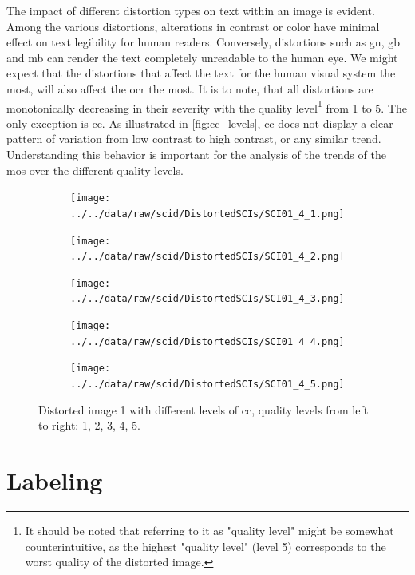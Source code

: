 The impact of different distortion types on text within an image is evident.
Among the various distortions, alterations in contrast or color have minimal effect on text legibility for human readers.
Conversely, distortions such as \gls{gn}, \gls{gb} and \gls{mb} can render the text completely unreadable to the human eye.
We might expect that the distortions that affect the text for the human visual system the most, will also affect the \gls{ocr} the most.
It is to note, that all distortions are monotonically decreasing in their severity with the quality level\footnote{It should be noted that referring to it as "quality level" might be somewhat counterintuitive, as the highest "quality level" (level 5) corresponds to the worst quality of the distorted image.} from 1 to 5.
The only exception is \gls{cc}.
As illustrated in \autoref{fig:cc_levels}, \gls{cc} does not display a clear pattern of variation from low contrast to high contrast, or any similar trend.
Understanding this behavior is important for the analysis of the trends of the \gls{mos} over the different quality levels.

\begin{figure}
    \centering
    \begin{subfigure}[b]{0.18\textwidth}
        \texttt{[image: ../../data/raw/scid/DistortedSCIs/SCI01\_4\_1.png]}
    \end{subfigure}
    \hfill
    \begin{subfigure}[b]{0.18\textwidth}
        \texttt{[image: ../../data/raw/scid/DistortedSCIs/SCI01\_4\_2.png]}
    \end{subfigure}
    \hfill
    \begin{subfigure}[b]{0.18\textwidth}
        \texttt{[image: ../../data/raw/scid/DistortedSCIs/SCI01\_4\_3.png]}
    \end{subfigure}
    \hfill
    \begin{subfigure}[b]{0.18\textwidth}
        \texttt{[image: ../../data/raw/scid/DistortedSCIs/SCI01\_4\_4.png]}
    \end{subfigure}
    \hfill
    \begin{subfigure}[b]{0.18\textwidth}
        \texttt{[image: ../../data/raw/scid/DistortedSCIs/SCI01\_4\_5.png]}
    \end{subfigure}
    \caption{Distorted image 1 with different levels of \gls{cc}, quality levels from left to right: 1, 2, 3, 4, 5.}
    \label{fig:cc_levels}
\end{figure}

\section{Labeling}
\label{sec:dataset_labeling}

